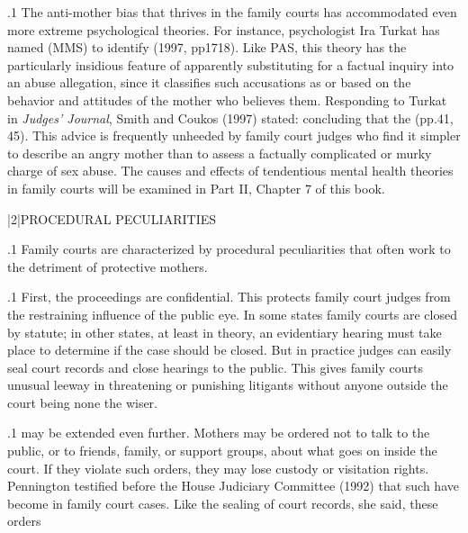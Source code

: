 \documentclass[11pt, twoside]{article}
\begin{document}
{\p.1{%
The anti-mother bias that thrives in the family courts has accommodated even more extreme psychological theories. For instance, psychologist Ira Turkat has
named  (MMS) to
identify  (1997, pp\ellThree{2pt}{2pt}17\ndash{}18). Like PAS, this theory has the particularly insidious feature of apparently substituting for a factual inquiry
into an abuse allegation, since it classifies such accusations as 
or  based on the behavior and attitudes of the mother who believes them. Responding to Turkat in \textit{Judges’ Journal}, Smith and Coukos
(1997) stated: 
concluding that the  (pp.\@ 41, 45). This advice is frequently unheeded by family court judges who find it simpler
to describe an angry mother than to assess a factually complicated or
murky charge of sex abuse. The causes and effects of tendentious mental
health theories in family courts will be examined in Part II, Chapter 7 of
this book.
}%


\s|2|{PROCEDURAL PECULIARITIES}

\p.1{%
Family courts are characterized by procedural peculiarities that often
work to the detriment of protective mothers.
}%

\p.1{%
First, the proceedings are confidential. This protects family court
judges from the restraining influence of the public eye. In some states
family courts are closed by statute; in other states, at least in theory,
an evidentiary hearing must take place to determine if the case should
be closed. But in practice judges can easily seal court records and close
hearings to the public. This gives family courts unusual leeway in threatening or punishing litigants without anyone outside the court being none
the wiser.
}%

\p.1{%
 may be extended even further. Mothers may be ordered not to talk to the public, or to friends, family, or support groups,
about what goes on inside the court. If they violate such orders, they
may lose custody or visitation rights. Pennington testified before the
House Judiciary Committee (1992) that such  have become
 in family court cases. Like the sealing of court records,
she said, these orders 
}%

}
\end{document}
